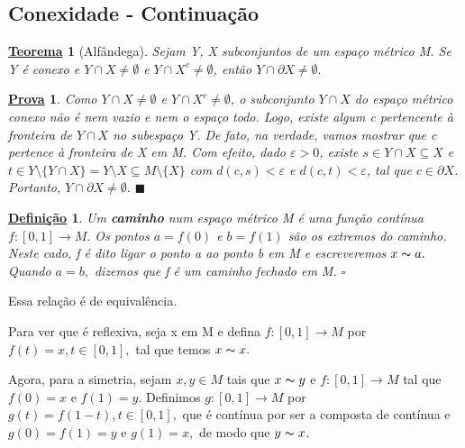 \documentclass{article}
\newtheorem*{def*}{\underline{Defini\c c\~ao}}
\newtheorem*{theorem*}{\underline{Teorema}}
\newtheorem*{proof*}{\underline{Prova}}
\renewcommand\qedsymbol{$\blacksquare$}
\begin{document}
\subsection{Conexidade - Continuação}
\begin{theorem*}[Alfândega]
  Sejam Y, X subconjuntos de um espaço métrico M. Se Y é conexo e \(Y\cap X \neq\emptyset\) e \(Y\cap X^{c}\neq\emptyset\), então
 \(Y\cap \partial X \neq\emptyset.\)
\end{theorem*}
\begin{proof*}
  Como \(Y\cap X \neq\emptyset\) e \(Y\cap X^{c} \neq\emptyset\), o subconjunto \(Y \cap X\) do espaço métrico conexo
não é nem vazio e nem o espaço todo. Logo, existe algum c pertencente à fronteira de \(Y\cap X\) no subespaço Y. De fato,
na verdade, vamos mostrar que c pertence à fronteira de X em M. Com efeito, dado \(\varepsilon >0\), existe \(s\in Y\cap X\subseteq{X}\) e 
 \(t\in Y\setminus\{Y\cap X\} = Y\setminus{X}\subseteq{M\setminus\{X\}}\) com \(d(c, s) < \varepsilon \) e \(d(c, t) < \varepsilon \), tal que
 \(c\in \partial X\). Portanto, \(Y\cap \partial X \neq\emptyset.\) \qedsymbol
\end{proof*}
\begin{def*}
  Um \textbf{caminho} num espaço métrico M é uma função contínua \(f:[0, 1]\rightarrow M.\) Os pontos \(a = f(0)\) e \(b = f(1)\) são os extremos
do caminho. Neste cado, f é dito ligar o ponto a ao ponto b em M e escreveremos \(x\thicksim a.\) Quando \(a = b,\) dizemos que f é um caminho fechado
em M. \(\square\)
\end{def*}
Essa relação é de equivalência. 

Para ver que é reflexiva, seja x em M e defina \(f:[0, 1]\rightarrow M\) por \(f(t) = x, t\in [0, 1],\) tal que temos \(x\thicksim x.\)

Agora, para a simetria, sejam \(x, y\in M\) tais que \(x\thicksim y\) e \(f:[0, 1]\rightarrow M\) tal que \(f(0) = x\) e \(f(1) = y\). Definimos \(g:[0, 1]\rightarrow M\) por
 \(g(t) = f(1-t), t\in [0, 1],\) que é contínua por ser a composta de contínua e \(g(0) = f(1) = y\) e \(g(1) = x,\) de modo que \(y\thicksim x\).
\end{document}
